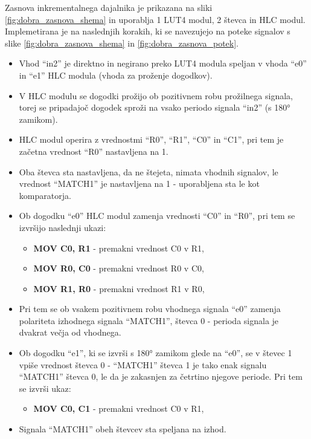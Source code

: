 \documentclass[a4paper]{article}
\begin{document}
\begin{sloppypar}
Zasnova inkrementalnega dajalnika je prikazana na sliki
\ref{fig:dobra_zasnova_shema} in uporablja 1 LUT4 modul, 2 števca in HLC modul.
Implemetirana je na naslednjih korakih, ki se navezujejo na poteke signalov s
slike \ref{fig:dobra_zasnova_shema} in \ref{fig:dobra_zasnova_potek}.
\begin{itemize}
    \item Vhod ``in2'' je direktno in negirano preko LUT4 modula speljan v
        vhoda ``e0'' in ``e1'' HLC modula (vhoda za proženje dogodkov).
    \item V HLC modulu se dogodki prožijo ob pozitivnem robu prožilnega
        signala, torej se pripadajoč dogodek sproži na vsako periodo signala
        ``in2'' (s 180° zamikom).
    \item HLC modul operira z vrednostmi ``R0'', ``R1'', ``C0'' in ``C1'', pri
        tem je začetna vrednost ``R0'' nastavljena na 1.
    \item Oba števca sta nastavljena, da ne štejeta, nimata vhodnih signalov,
        le vrednost ``MATCH1'' je nastavljena na 1 - uporabljena sta le kot
        komparatorja.
    \item Ob dogodku ``e0'' HLC modul zamenja vrednosti ``C0'' in ``R0'', pri
        tem se izvršijo naslednji ukazi:
    \begin{itemize}
        \item \textbf{MOV C0, R1} - premakni vrednost C0 v R1,
        \item \textbf{MOV R0, C0} - premakni vrednost R0 v C0,
        \item \textbf{MOV R1, R0} - premakni vrednost R1 v R0,
    \end{itemize}
    \item Pri tem se ob vsakem pozitivnem robu vhodnega signala ``e0'' zamenja
        polariteta izhodnega signala ``MATCH1'', števca 0 - perioda signala je
        dvakrat večja od vhodnega.
    \item Ob dogodku ``e1'', ki se izvrši s 180° zamikom glede na ``e0'', se v
        števec 1 vpiše vrednost števca 0 - ``MATCH1'' števca 1 je tako enak
        signalu ``MATCH1'' števca 0, le da je zakasnjen za četrtino njegove
        periode. Pri tem se izvrši ukaz:
    \begin{itemize}
        \item \textbf{MOV C0, C1} - premakni vrednost C0 v R1,
    \end{itemize}
    \item Signala ``MATCH1'' obeh števcev sta speljana na izhod.
\end{itemize}


\end{sloppypar}
\end{document}
